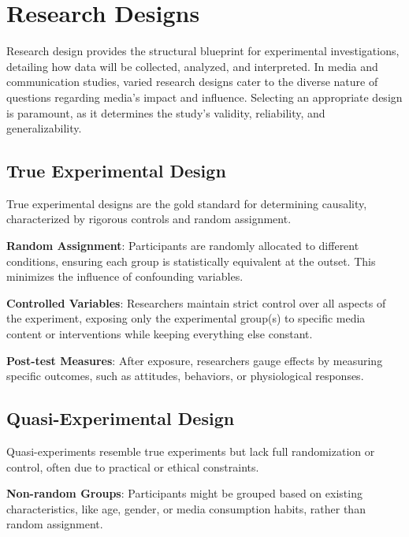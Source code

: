 \documentclass[
  b5paper]{book}
\begin{document}
\hypertarget{research-designs}{%
\section{Research Designs}\label{research-designs}}

Research design provides the structural blueprint for experimental investigations, detailing how data will be collected, analyzed, and interpreted. In media and communication studies, varied research designs cater to the diverse nature of questions regarding media's impact and influence. Selecting an appropriate design is paramount, as it determines the study's validity, reliability, and generalizability.

\hypertarget{true-experimental-design}{%
\subsection*{True Experimental Design}\label{true-experimental-design}}

True experimental designs are the gold standard for determining causality, characterized by rigorous controls and random assignment.

\textbf{Random Assignment}: Participants are randomly allocated to different conditions, ensuring each group is statistically equivalent at the outset. This minimizes the influence of confounding variables.

\textbf{Controlled Variables}: Researchers maintain strict control over all aspects of the experiment, exposing only the experimental group(s) to specific media content or interventions while keeping everything else constant.

\textbf{Post-test Measures}: After exposure, researchers gauge effects by measuring specific outcomes, such as attitudes, behaviors, or physiological responses.

\hypertarget{quasi-experimental-design}{%
\subsection*{Quasi-Experimental Design}\label{quasi-experimental-design}}

Quasi-experiments resemble true experiments but lack full randomization or control, often due to practical or ethical constraints.

\textbf{Non-random Groups}: Participants might be grouped based on existing characteristics, like age, gender, or media consumption habits, rather than random assignment.
\end{document}
